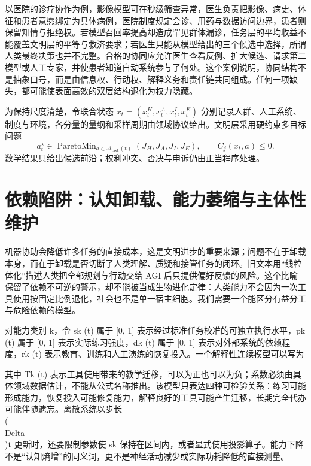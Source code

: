以医院的诊疗协作为例，影像模型可在秒级筛查异常，医生负责把影像、病史、体征和患者意愿绑定为具体病例，医院制度规定会诊、用药与数据访问边界，患者则保留知情与拒绝权。若模型召回率提高却造成罕见群体漏诊，任务层的平均收益不能覆盖文明层的平等与救济要求；若医生只能从模型给出的三个候选中选择，所谓人类最终决策也并不完整。合格的协同应允许医生查看反例、扩大候选、请求第二模型或人工专家，并使患者知道自动系统参与了何处。这个案例说明，协同结构不是抽象口号，而是由信息权、行动权、解释义务和责任链共同组成。任何一项缺失，都可能使表面高效的双层结构退化为权力隐藏。

为保持尺度清楚，令联合状态 $x_t=(x_t^H,x_t^A,x_t^I,x_t^E)$ 分别记录人群、人工系统、制度与环境，各分量的量纲和采样周期由领域协议给出。文明层采用硬约束多目标问题
\begin{equation}
a_t^\star\in \operatorname{ParetoMin}_{a\in\mathcal A_{\mathrm{task}}(t)}(J_H,J_A,J_I,J_E),\qquad C_j(x_t,a)\le 0.
\end{equation}
数学结果只给出候选前沿；权利冲突、否决与申诉仍由正当程序处理。

\section{依赖陷阱：认知卸载、能力萎缩与主体性维护}

\label{sec:entropy_trap_mitochondrialization}

机器协助会降低许多任务的直接成本，这是文明进步的重要来源；问题不在于卸载本身，而在于卸载是否切断了人类理解、质疑和接管任务的闭环。旧文本用“线粒体化”描述人类把全部规划与行动交给 AGI 后只提供偏好反馈的风险。这个比喻保留了依赖不可逆的警示，却不能被当成生物进化定律：人类能力不会因为一次工具使用按固定比例退化，社会也不是单一宿主细胞。我们需要一个能区分有益分工与危险依赖的模型。

对能力类别 k，令 sk (t) 属于 [0, 1] 表示经过标准任务校准的可独立执行水平，pk (t) 属于 [0, 1] 表示实际练习强度，dk (t) 属于 [0, 1] 表示对外部系统的依赖程度，rk (t) 表示教育、训练和人工演练的恢复投入。一个解释性连续模型可以写为

其中 Tk (t) 表示工具使用带来的教学迁移，可以为正也可以为负；系数必须由具体领域数据估计，不能从公式名称推出。该模型只表达四种可检验关系：练习可能形成能力，恢复投入可能修复能力，解释良好的工具可能产生迁移，长期完全代办可能伴随遗忘。离散系统以步长 \\(\\Delta\\)t 更新时，还要限制参数使 sk 保持在区间内，或者显式使用投影算子。能力下降不是“认知熵增”的同义词，更不是神经活动减少或实际功耗降低的直接测量。

